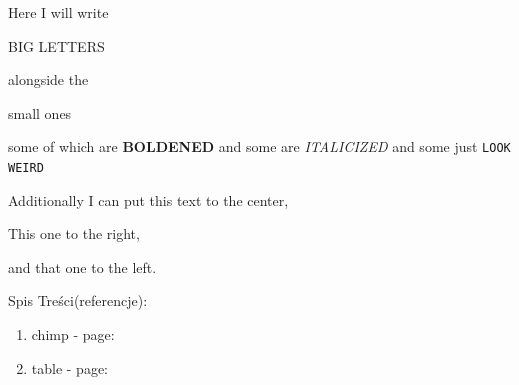 Here I will write \begin{Huge}BIG LETTERS\end{Huge} alongside the \begin{tiny}small ones\end{tiny} some of which are \textbf{BOLDENED}  and some are \textit{ITALICIZED} and some just \texttt{LOOK WEIRD}
\begin{center}
Additionally I can put this text to the center,
\end{center}
\begin{flushright}
This one to the right,
\end{flushright}
\begin{flushleft}
and that one to the left.
\end{flushleft}



\newpage
\begin{Large} Spis Treści(referencje): \end{Large}
\begin{enumerate}
\item chimp - page: \pageref{fig:chimp}
\item table - page: \pageref{tab:my_label}
\end{enumerate}